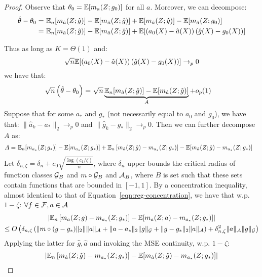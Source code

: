 \begin{proof}
Observe that $\theta_0 = \mathbb{E}[m_{a}(Z; g_0)]$ for all $a$. Moreover, we can decompose:
\begin{align}
    \hat{\theta}-\theta_0 =~& \mathbb{E}_n[m_{\hat{a}}(Z; \hat{g})] - \mathbb{E}[m_{\hat{a}}(Z; \hat{g})] + \mathbb{E}[m_{\hat{a}}(Z; \hat{g})] - \mathbb{E}[m_{\hat{a}}(Z; g_0)]\\
    =~& \mathbb{E}_n[m_{\hat{a}}(Z; \hat{g})] - \mathbb{E}[m_{\hat{a}}(Z; \hat{g})]  + \mathbb{E}[(a_0(X) - \hat{a}(X))\, (\hat{g}(X) - g_0(X))]
\end{align}

Thus as long as $K=\Theta(1)$ and:
\begin{equation}
    \sqrt{n} \mathbb{E}[(a_0(X) - \hat{a}(X))\, (\hat{g}(X) - g_0(X))] \rightarrow_p 0
\end{equation}
we have that:
\begin{align}
    \sqrt{n}\left(\hat{\theta}-\theta_0\right) =~& \sqrt{n} \underbrace{\mathbb{E}_n[m_{\hat{a}}(Z; \hat{g})] - \mathbb{E}[m_{\hat{a}}(Z; \hat{g})]}_{A} + o_p(1)
\end{align}
Suppose that for some $a_*$ and $g_*$ (not necessarily equal to $a_0$ and $g_0$), we have that: $\|\hat{a}_k-a_*\|_2 \to_p 0$ and $\|\hat{g}_k-g_*\|_2\to_p 0$. Then we can further decompose $A$ as:
\begin{align}
    A =~& \mathbb{E}_n[m_{a_*}(Z; g_*)] - \mathbb{E}[m_{a_*}(Z; g_*)] + \mathbb{E}_n\left[m_{\hat{a}}(Z; \hat{g}) - m_{a_*}(Z; g_*)\right] - \mathbb{E}[m_{\hat{a}}(Z; \hat{g}) - m_{a_*}(Z; g_*)]
\end{align}
Let $\delta_{n,\zeta}=\delta_n + c_0 \sqrt{\frac{\log(c_1/\zeta)}{n}}$, where $\delta_n$ upper bounds the critical radius of function classes ${\mathcal G}_B$ and $m \circ {\mathcal G}_B$ and ${\mathcal A}_B$, where $B$ is set such that these sets contain functions that are bounded in $[-1, 1]$. By a concentration inequality, almost identical to that of Equation~\eqref{eqn:reg-concentration}, we have that w.p. $1-\zeta$: $\forall f\in {\mathcal F}, a\in {\mathcal A}$
\begin{multline}
     \left|\mathbb{E}_n\left[m_{a}(Z; g) - m_{a_*}(Z; g_*)\right] - \mathbb{E}[m_{a}(Z; a) - m_{a_*}(Z; g_*)]\right| \\
     \leq O\left(\delta_{n,\zeta} \left(\|m\circ (g - g_*)\|_2 \| \|a\|_{{\mathcal A}} + \|a-a_*\|_2 \|g\|_{{\mathcal G}} + \|g-g_*\|_2 \|a\|_{{\mathcal A}}\right) + \delta_{n,\zeta}^2 \|a\|_{{\mathcal A}} \|g\|_{{\mathcal G}}\right)
\end{multline}
Applying the latter for $\hat{g}, \hat{a}$ and invoking the MSE continuity, w.p. $1-\zeta$:
\begin{multline}
     \left|\E_n\left[m_{\hat{a}}(Z; \hat{g}) - m_{a_*}(Z; g_*)\right] - \E[m_{\hat{a}}(Z; \hat{g}) - m_{a_*}(Z; g_*)]\right| \\

\end{multline}
\end{proof}
